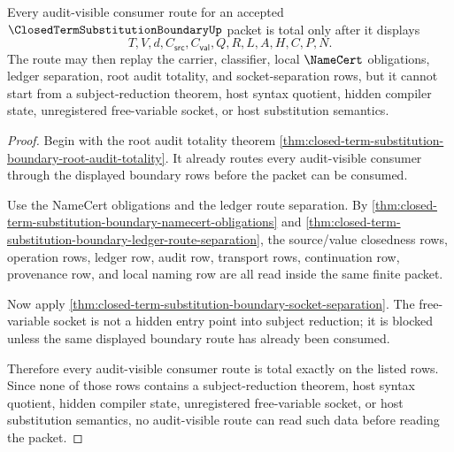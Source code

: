 \begin{theorem}
\label{thm:closed-term-substitution-boundary-audit-route-totality}
Every audit-visible consumer route for an accepted $\ClosedTermSubstitutionBoundaryUp$ packet is total only after it displays
$$
T,V,d,C_{\mathsf{src}},C_{\mathsf{val}},Q,R,L,A,H,C,P,N.
$$
The route may then replay the carrier, classifier, local $\NameCert$ obligations, ledger separation, root audit totality, and socket-separation rows, but it cannot start from a subject-reduction theorem, host syntax quotient, hidden compiler state, unregistered free-variable socket, or host substitution semantics.
\end{theorem}
\begin{proof}
Begin with the root audit totality theorem \autoref{thm:closed-term-substitution-boundary-root-audit-totality}. It already routes every audit-visible consumer through the displayed boundary rows before the packet can be consumed.

Use the NameCert obligations and the ledger route separation. By \autoref{thm:closed-term-substitution-boundary-namecert-obligations} and \autoref{thm:closed-term-substitution-boundary-ledger-route-separation}, the source/value closedness rows, operation rows, ledger row, audit row, transport rows, continuation row, provenance row, and local naming row are all read inside the same finite packet.

Now apply \autoref{thm:closed-term-substitution-boundary-socket-separation}. The free-variable socket is not a hidden entry point into subject reduction; it is blocked unless the same displayed boundary route has already been consumed.

Therefore every audit-visible consumer route is total exactly on the listed rows. Since none of those rows contains a subject-reduction theorem, host syntax quotient, hidden compiler state, unregistered free-variable socket, or host substitution semantics, no audit-visible route can read such data before reading the packet.
\end{proof}
